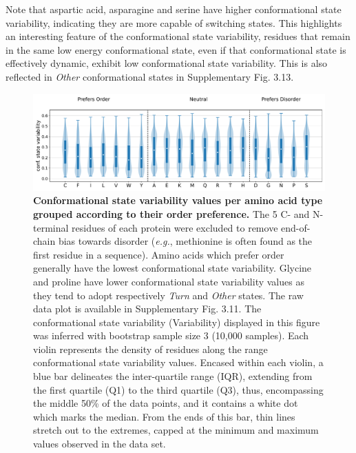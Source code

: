 Note that aspartic acid, asparagine and serine have higher conformational state variability, indicating they are more capable of switching states. This highlights an interesting feature of the conformational state variability, residues that remain in the same low energy conformational state, even if that conformational state is effectively dynamic, exhibit low conformational state variability. This is also reflected in \textit{Other} conformational states in Supplementary Fig. 3.13.

\begin{figure}[!t]
\centering
\includegraphics[width=\textwidth]{constava/figures_constava/figure6.pdf}
\caption{\textbf{Conformational state variability values per amino acid type grouped according to their order preference.} The 5 C- and N-terminal residues of each protein were excluded to remove end-of-chain bias towards disorder (\textit{e.g.}, methionine is often found as the first residue in a sequence). Amino acids which prefer order generally have the lowest conformational state variability. Glycine and proline have lower conformational state variability values as they tend to adopt respectively \textit{Turn} and \textit{Other} states. The raw data plot is available in Supplementary Fig. 3.11.
The conformational state variability (Variability) displayed in this figure was inferred with bootstrap sample size 3 (10,000 samples). Each violin represents the density of residues along the range conformational state variability values. Encased within each violin, a blue bar delineates the inter-quartile range (IQR), extending from the first quartile (Q1) to the third quartile (Q3), thus, encompassing the middle 50\% of the data points, and it contains a white dot which marks the median. From the ends of this bar, thin lines stretch out to the extremes, capped at the minimum and maximum values observed in the data set.
}\label{fig:conva_per_aa_class}
\end{figure}

